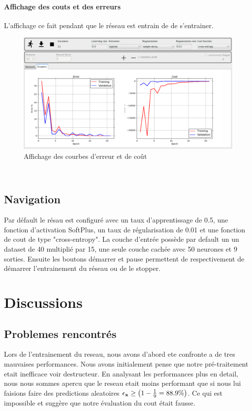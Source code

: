 \documentclass[11pt]{article}
\begin{document}
\paragraph{Affichage des couts et des erreurs}
L'affichage ce fait pendant que le r\'eseau est entrain de de s'entrainer.
\begin{figure}[htp]
	\centering
	\includegraphics[scale=.25]{img/courbe.png}
	\caption{Affichage des courbes d'erreur et de co\^ut}
\end{figure} \\

\subsection{Navigation}
Par d\'efault le r\'esau est configur\'e avec un taux d'apprentissage de 0.5,
une fonction d'activation SoftPlus, un taux de r\'egularisation de 0.01 et une
fonction de cout de type "cross-entropy". La couche d'entr\'ee poss\`ede par
default un un dataset de 40 multipli\'e par 15, une seule couche cach\'ee avec
50 neurones et 9 sorties. Ensuite les boutons d\'emarrer et pause permettent
de respectivement de d\'emarrer l'entrainement du r\'eseau ou de le stopper.



\section{Discussions}
\subsection{Problemes rencontr\'es}
Lors de l'entrainement du reseau, nous avons d'abord ete confronte a de tres
mauvaises performances. Nous avons initialement pense que notre pr\'e-traitement
etait inefficace voir destructeur. En analysant les performances plus en detail,
nous nous sommes apercu que le reseau etait moins performant que si nous lui
faisions faire des predictions aleatoires
$\epsilon_{\bf x} \ge \left (1 - \frac{1}{9} = 88.9\% \right)$.
Ce qui est impossible et sugg\`ere que notre \'evaluation du cout \'etait fausse.
\end{document}
